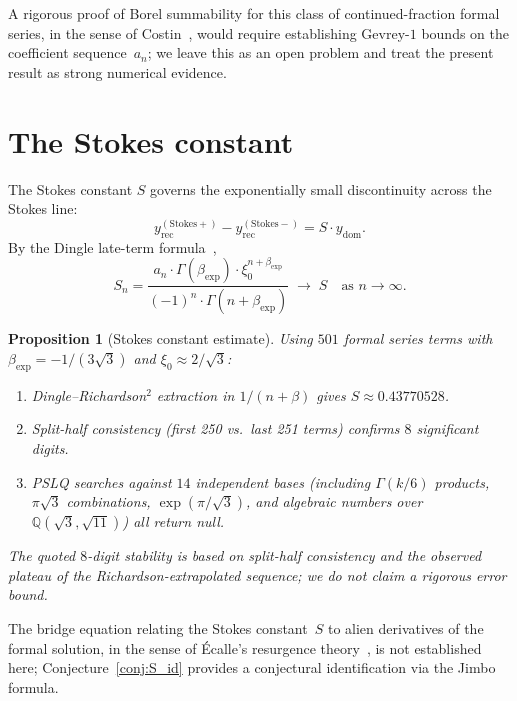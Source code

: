 \documentclass[11pt,a4paper]{article}
\newtheorem{proposition}[theorem]{Proposition}
\theoremstyle{definition}
\theoremstyle{remark}
\newcommand{\Q}{\mathbb{Q}}
\begin{document}
A rigorous proof of Borel summability for this class of
continued-fraction formal series, in the sense of
Costin~\cite{costin1998}, would require establishing
Gevrey-$1$ bounds on the coefficient sequence~$a_n$;
we leave this as an open problem and treat the present
result as strong numerical evidence.


\section{The Stokes constant}
\label{sec:stokes}

The Stokes constant $S$ governs the
exponentially small discontinuity across
the Stokes line:
\[
  y_{\mathrm{rec}}^{(\text{Stokes}+)}
  - y_{\mathrm{rec}}^{(\text{Stokes}-)}
  = S \cdot y_{\mathrm{dom}}.
\]
By the Dingle late-term
formula~\cite{dingle1973},
\begin{equation}\label{eq:dingle}
  S_n = \frac{a_n \cdot \Gamma(\beta_{\mathrm{exp}})
  \cdot \xi_0^{n+\beta_{\mathrm{exp}}}}
  {(-1)^n \cdot \Gamma(n+\beta_{\mathrm{exp}})}
  \;\longrightarrow\; S
  \quad\text{as } n\to\infty.
\end{equation}

\begin{proposition}[Stokes constant estimate]
\label{prop:stokes}
Using $501$ formal series terms with
$\beta_{\mathrm{exp}} = -1/(3\sqrt{3})$ and
$\xi_0 \approx 2/\sqrt{3}$:
\begin{enumerate}
\item[\textup{(i)}]
  Dingle--Richardson${}^2$ extraction in
  $1/(n+\beta)$ gives
  $S \approx 0.43770528$.
\item[\textup{(ii)}]
  Split-half consistency (first 250 vs.\
  last 251 terms) confirms $8$ significant
  digits.
\item[\textup{(iii)}]
  PSLQ searches against $14$ independent
  bases (including $\Gamma(k/6)$ products,
  $\pi\sqrt{3}$ combinations, $\exp(\pi/\sqrt{3})$,
  and algebraic numbers over
  $\Q(\sqrt{3},\sqrt{11})$) all return null.
\end{enumerate}
The quoted $8$-digit stability is based on
split-half consistency and the observed plateau
of the Richardson-extrapolated sequence; we do
not claim a rigorous error bound.
\end{proposition}

The bridge equation relating the Stokes constant~$S$ to
alien derivatives of the formal solution, in the sense of
\'Ecalle's resurgence theory~\cite{ecalle1981}, is not
established here; Conjecture~\ref{conj:S_id} provides
a conjectural identification via the Jimbo~\cite{Jimbo1982}
formula.
\end{document}
